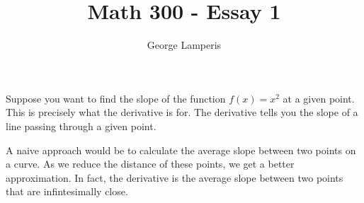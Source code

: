 \documentclass[12pt]{article}
\title{Math 300 - Essay 1}
\author{George Lamperis}
\date{}
\begin{document}
\maketitle

Suppose you want to find the slope of the function $f(x) = x^2$ at a given
point. This is precisely what the derivative is for. The derivative tells you
the slope of a line passing through a given point.

A naive approach would be to calculate the average slope between two points on a
curve. As we reduce the distance of these points, we get a better approximation.
In fact, the derivative is the average slope between two points that are
infintesimally close.
\end{document}
